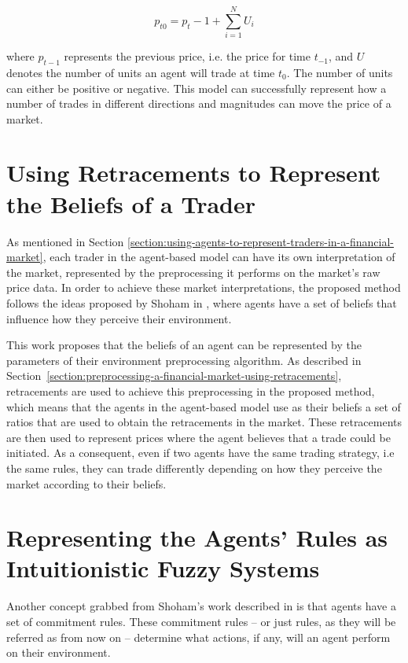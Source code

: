 \begin{equation}
  \label{equation:sum-of-agents-units}
  p_{t0} = p_t-1 + \sum_{i=1}^{N} U_i
\end{equation}

where $p_{t-1}$ represents the previous price, i.e. the price for time $t_{-1}$, and
$U$ denotes the number of units an agent will trade at time $t_0$. The number of
units can either be positive or negative. This model can successfully represent
how a number of trades in different directions and magnitudes can move the price
of a market.

\section{Using Retracements to Represent the Beliefs of a Trader}
\label{section:using-retracements-to-represent-the-beliefs-of-a-trader}

As mentioned in Section
\ref{section:using-agents-to-represent-traders-in-a-financial-market}, each
trader in the agent-based model can have its own interpretation of the market,
represented by the preprocessing it performs on the market's raw price data. In
order to achieve these market interpretations, the proposed method follows the
ideas proposed by Shoham in \cite{Shoham1993}, where agents have a set of
beliefs that influence how they perceive their environment.

This work proposes that the beliefs of an agent can be represented by the
parameters of their environment preprocessing algorithm. As described in 
Section~\ref{section:preprocessing-a-financial-market-using-retracements}, 
retracements
are used to achieve this preprocessing in the proposed method, which means that
the agents in the agent-based model use as their beliefs a set of ratios that
are used to obtain the retracements in the market. These retracements are then
used to represent prices where the agent believes that a trade could be
initiated. As a consequent, even if two agents have the same trading strategy,
i.e the same rules, they can trade differently depending on how they perceive
the market according to their beliefs.

\section{Representing the Agents' Rules as Intuitionistic Fuzzy Systems}
\label{section:representing-the-agents-rules-as-intuitionistic-fuzzy-systems}

Another concept grabbed from Shoham's work described in \cite{Shoham1993} is
that agents have a set of commitment rules. These commitment rules -- or just
rules, as they will be referred as from now on -- determine what actions, if
any, will an agent perform on their environment.


